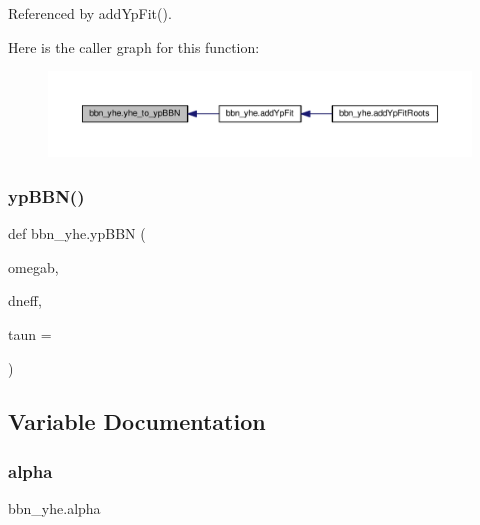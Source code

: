 Referenced by add\+Yp\+Fit().

Here is the caller graph for this function\+:
\nopagebreak
\begin{figure}[H]
\begin{center}
\leavevmode
\includegraphics[width=350pt]{namespacebbn__yhe_a38c5abbad8fad900f60f86b5038cf0e8_icgraph}
\end{center}
\end{figure}
\mbox{\label{namespacebbn__yhe_a0ae2fc2b1719f17ae48ec9dee3de6728}} 
\subsubsection{\texorpdfstring{yp\+B\+B\+N()}{ypBBN()}}
{\footnotesize\ttfamily def bbn\+\_\+yhe.\+yp\+B\+BN (\begin{DoxyParamCaption}\item[{}]{omegab,  }\item[{}]{dneff,  }\item[{}]{taun = {} }\end{DoxyParamCaption})}



\subsection{Variable Documentation}
\mbox{\label{namespacebbn__yhe_aee3ed9037ad3216e40a5e87b91d33f27}} 
\subsubsection{\texorpdfstring{alpha}{alpha}}
{\footnotesize\ttfamily bbn\+\_\+yhe.\+alpha}

\mbox{\label{namespacebbn__yhe_a4e580183b4dd2ab4042be13ffec6c525}} 
